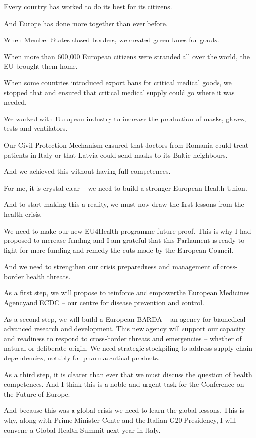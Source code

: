 \documentclass[a4paper,11pt]{article}
\begin{document}
Every country has worked to do its best for its citizens.

And Europe has done more together than ever before.

When Member States closed borders, we created green lanes for goods.

When more than 600,000 European citizens were stranded all over the world, the EU brought them home.

When some countries introduced export bans for critical medical goods, we stopped that and ensured that critical medical supply could go where it was needed.

We worked with European industry to increase the production of masks, gloves, tests and ventilators.

Our Civil Protection Mechanism ensured that doctors from Romania could treat patients in Italy or that Latvia could send masks to its Baltic neighbours. 

And we achieved this without having full competences.

For me, it is crystal clear – we need to build a stronger European Health Union.

And to start making this a reality, we must now draw the first lessons from the health crisis.

We need to make our new EU4Health programme future proof.  This is why I had proposed to increase funding and I am grateful that this Parliament is ready to fight for more funding and remedy the cuts made by the European Council.

And we need to strengthen our crisis preparedness and management of cross-border health threats.

As a first step, we will propose to reinforce and empowerthe European Medicines Agencyand ECDC – our centre for disease prevention and control.

As a second step, we will build a European BARDA – an agency for biomedical advanced research and development. This new agency will support our capacity and readiness to respond to cross-border threats and emergencies – whether of natural or deliberate origin. We need strategic stockpiling to address supply chain dependencies, notably for pharmaceutical products.

As a third step, it is clearer than ever that we must discuss the question of health competences. And I think this is a noble and urgent task for the Conference on the Future of Europe.

And because this was a global crisis we need to learn the global lessons. This is why, along with Prime Minister Conte and the Italian G20 Presidency, I will convene a Global Health Summit next year in Italy.
\end{document}
